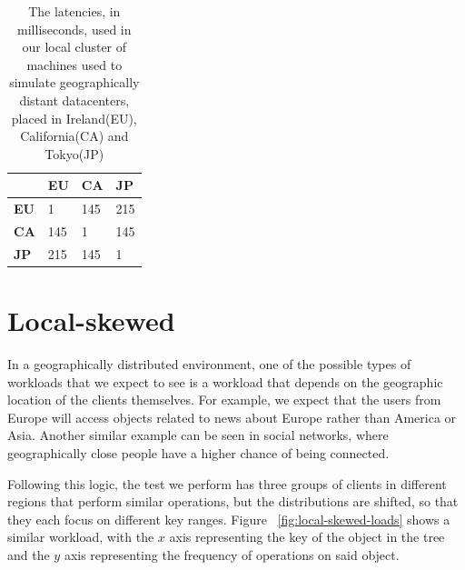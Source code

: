\begin{table}[!htb]
  \centering
  \begin{tabular}{l l l l}
    \hline
    & \textbf{EU} & \textbf{CA} & \textbf{JP} \\
    \hline
    \textbf{EU} & 1 & 145 & 215 \\
    \textbf{CA} & 145 & 1 & 145 \\
    \textbf{JP} & 215 & 145 & 1 \\
    \hline
  \end{tabular}
  \caption{The latencies, in milliseconds, used in our local cluster of machines used to simulate geographically distant datacenters, placed in Ireland(EU), California(CA) and Tokyo(JP)}\label{tab:latencies}
\end{table}


\section{Local-skewed}\label{sec:local-skewed}
In a geographically distributed environment, one of the possible types of workloads that we expect to see is a workload that depends on the geographic location of the clients themselves. For example, we expect that the users from Europe will access objects related to news about Europe rather than America or Asia. Another similar example can be seen in social networks, where geographically close people have a higher chance of being connected.

Following this logic, the test we perform has three groups of clients in different regions that perform similar operations, but the distributions are shifted, so that they each focus on different key ranges. Figure ~\ref{fig:local-skewed-loads} shows a similar workload, with the $x$ axis representing the key of the object in the tree and the $y$ axis representing the frequency of operations on said object.

